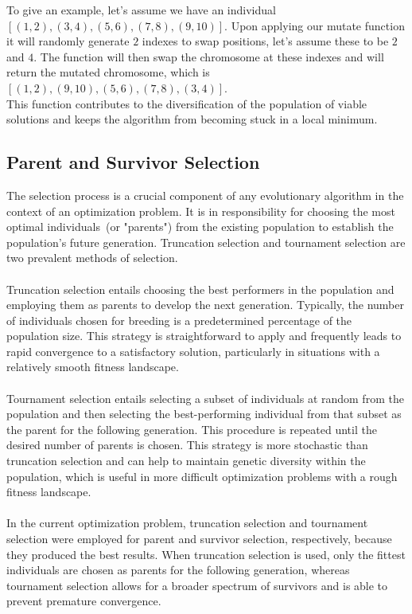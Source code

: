 \documentclass[conference]{IEEEtran}
\begin{document}
To give an example, let's assume we have an individual $[ (1, 2), (3, 4), (5, 6), (7, 8), (9, 10) ]$. Upon applying our mutate function it will randomly generate $2$ indexes to swap positions, let's assume these to be $2$ and $4$. The function will then swap the chromosome at these indexes and will return the mutated chromosome, which is $[ (1, 2), (9, 10), (5, 6), (7, 8), (3, 4) ]$.\\


This function contributes to the diversification of the population of viable solutions and keeps the algorithm from becoming stuck in a local minimum.
\subsection{Parent and Survivor Selection}
The selection process is a crucial component of any evolutionary algorithm in the context of an optimization problem. It is in responsibility for choosing the most optimal individuals (or "parents") from the existing population to establish the population's future generation. Truncation selection and tournament selection are two prevalent methods of selection.
\\\\
Truncation selection entails choosing the best performers in the population and employing them as parents to develop the next generation. Typically, the number of individuals chosen for breeding is a predetermined percentage of the population size. This strategy is straightforward to apply and frequently leads to rapid convergence to a satisfactory solution, particularly in situations with a relatively smooth fitness landscape.
\\\\
Tournament selection entails selecting a subset of individuals at random from the population and then selecting the best-performing individual from that subset as the parent for the following generation. This procedure is repeated until the desired number of parents is chosen. This strategy is more stochastic than truncation selection and can help to maintain genetic diversity within the population, which is useful in more difficult optimization problems with a rough fitness landscape.
\\\\
In the current optimization problem, truncation selection and tournament selection were employed for parent and survivor selection, respectively, because they produced the best results. When truncation selection is used, only the fittest individuals are chosen as parents for the following generation, whereas tournament selection allows for a broader spectrum of survivors and is able to prevent premature convergence.
\end{document}
